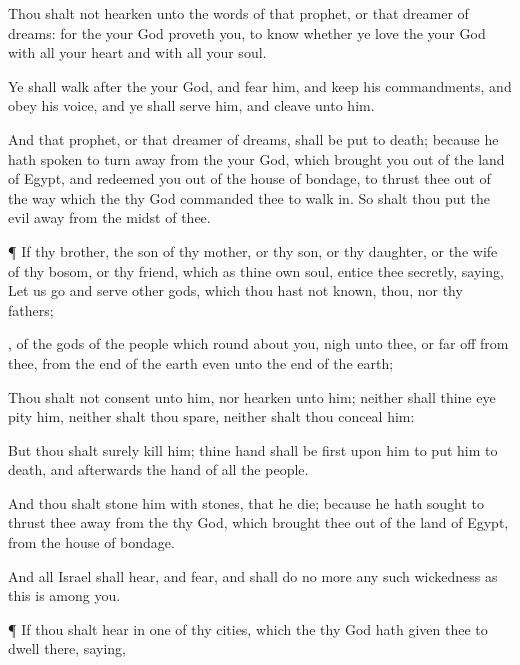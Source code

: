 {Thou shalt not
hearken unto the
words of that
prophet, or that
dreamer of
dreams: for the
{} your
God
proveth you, to
know whether
ye
love the
{} your
God with all your
heart and with all your
soul.

Ye shall
walk
after the
{} your
God, and
fear him, and
keep his
commandments, and
obey his
voice, and ye shall
serve him, and
cleave unto him.

And that
prophet, or that
dreamer of
dreams, shall be put to
death; because he hath
spoken to
turn
{} away from the
{} your
God, which brought you
out of the
land of
Egypt, and
redeemed you out of the
house of
bondage, to
thrust thee out of the
way which the
{} thy
God
commanded thee to walk
in. So shalt thou
put the
evil
away from the
midst of thee.


\par }{\PP {}¶ If thy
brother, the
son of thy
mother, or thy
son, or thy
daughter, or the
wife of thy
bosom, or thy
friend, which
{} as thine own
soul,
entice thee
secretly,
saying, Let us
go and
serve
other
gods, which thou hast not
known, thou, nor thy
fathers;

, of the
gods of the
people which
{} round
about you,
nigh unto thee, or far
off from thee, from the
{}
end of the
earth even unto the
{}
end of the
earth;

Thou shalt not
consent unto him, nor
hearken unto him; neither shall thine
eye
pity him, neither shalt thou
spare, neither shalt thou
conceal him:

But thou shalt
surely
kill him; thine
hand shall be
first upon him to put him to
death, and
afterwards the
hand of all the
people.

And thou shalt
stone him with
stones, that he
die; because he hath
sought to thrust thee
away from the
{} thy
God, which brought thee
out of the
land of
Egypt, from the
house of
bondage.

And all
Israel shall
hear, and
fear, and shall
do no
more
any such
wickedness as this is
among you.


\par }{\PP {}¶ If thou shalt
hear
{} in
one of thy
cities, which the
{} thy
God hath
given thee to
dwell there,
saying,

}
